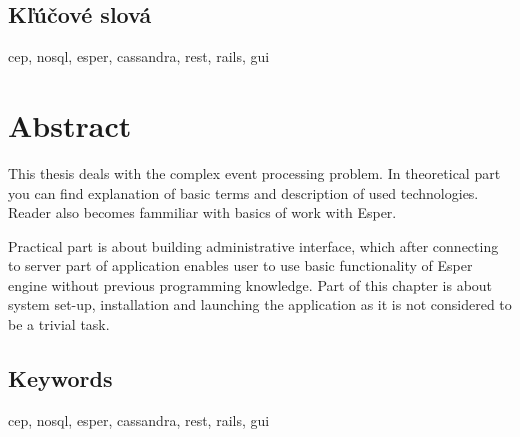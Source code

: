 \documentclass[12pt, a4paper, oneside]{book} %
\begin{document}
\section*{Kľúčové slová}
cep, nosql, esper, cassandra, rest, rails, gui \emptydoublepage

\chapter*{Abstract}
This thesis deals with the complex event processing problem. In theoretical part you can find explanation of basic terms and description of used technologies. Reader also becomes fammiliar with basics of work with Esper.

Practical part is about building administrative interface, which after connecting to server part of application enables user to use basic functionality of Esper engine without previous programming knowledge. Part of this chapter is about system set-up, installation and launching the application as it is not considered to be a trivial task.

\section*{Keywords}
cep, nosql, esper, cassandra, rest, rails, gui \emptydoublepage

\tableofcontents \emptydoublepage

\mainmatter

%










\backmatter

	\emptydoublepage

\listoffigures \emptydoublepage
\listoftables
\end{document}
